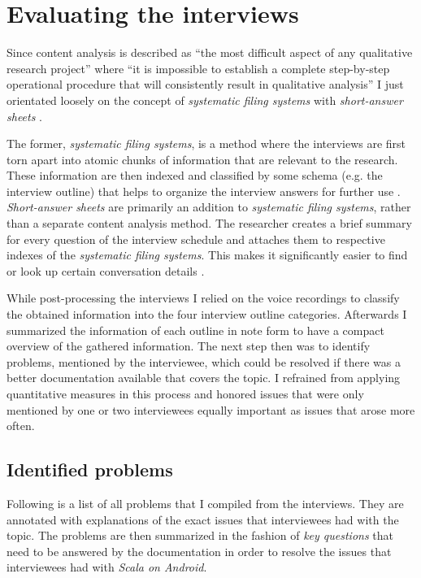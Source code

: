 \section{Evaluating the interviews}

Since content analysis is described as \enquote{the most difficult aspect of any qualitative research project} where \enquote{it is impossible to establish a complete step-by-step operational procedure that will consistently result in qualitative analysis} \cite[p. 102]{berg01} I just orientated loosely on the concept of \textit{systematic filing systems} \cite[p. 103]{berg01} with \textit{short-answer sheets} \cite[p. 105]{berg01}.

The former, \textit{systematic filing systems}, is a method where the interviews are first torn apart into atomic chunks of information that are relevant to the research. These information are then indexed and classified by some schema (e.g. the interview outline) that helps to organize the interview answers for further use \cite[p. 103]{berg01}. \textit{Short-answer sheets} are primarily an addition to \textit{systematic filing systems}, rather than a separate content analysis method. The researcher creates a brief summary for every question of the interview schedule and attaches them to respective indexes of the \textit{systematic filing systems}. This makes it significantly easier to find or look up certain conversation details \cite[p. 105]{berg01}.

While post-processing the interviews I relied on the voice recordings to classify the obtained information into the four interview outline categories. Afterwards I summarized the information of each outline in note form to have a compact overview of the gathered information. The next step then was to identify problems, mentioned by the interviewee, which could be resolved if there was a better documentation available that covers the topic. I refrained from applying quantitative measures in this process and honored issues that were only mentioned by one or two interviewees equally important as issues that arose more often.

\subsection{Identified problems}

Following is a list of all problems that I compiled from the interviews. They are annotated with explanations of the exact issues that interviewees had with the topic. The problems are then summarized in the fashion of \textit{key questions} that need to be answered by the documentation in order to resolve the issues that interviewees had with \textit{Scala on Android}.

